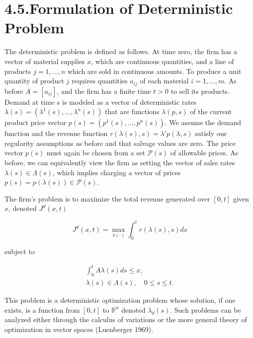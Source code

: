 \section{4.5.Formulation of Deterministic Problem}\label{formulation-ofdeterministic-problem}

The deterministic problem is defined as follows. At time zero, the firm has a vector of material supplies \(x\), which are continuous quantities, and a line of products \(j = 1, \dots, n\) which are sold in continuous amounts. To produce a unit quantity of product \(j\) requires quantities \(a_{ij}\) of each material \(i = 1, \ldots, m\). As before \(A = [a_{ij}]\), and the firm has a finite time \(t > 0\) to sell its products. Demand at time \(s\) is modeled as a vector of deterministic rates \(\lambda(s) = (\lambda^1(s), \ldots, \lambda^n(s))\) that are functions \(\lambda(p, s)\) of the current product price vector \(p(s) = (p^1(s), \ldots, p^n(s))\). We assume the demand function and the revenue function \(r(\lambda(s), s) = \lambda' p(\lambda, s)\) satisfy our regularity assumptions as before and that salvage values are zero. The price vector \(p(s)\) must again be chosen from a set \(\mathcal{P}(s)\) of allowable prices. As before, we can equivalently view the firm as setting the vector of sales rates \(\lambda(s) \in \Lambda(s)\), which implies charging a vector of prices \(p(s) = p(\lambda(s)) \in \mathcal{P}(s)\).

The firm's problem is to maximize the total revenue generated over \([0, t]\) given \(x\), denoted \(J^d(x, t)\)

\[
J^d(x, t) = \operatorname*{max}_{\lambda(\cdot)} \int_{0}^{t} r(\lambda(s), s)  ds
\]

subject to

\[
\begin{array}{l}
\displaystyle \int_{0}^{t} A \lambda(s)  ds \leqslant x, \\
\lambda(s) \in \Lambda(s), \quad 0 \leqslant s \leqslant t.
\end{array}
\]

This problem is a deterministic optimization problem whose solution, if one exists, is a function from \([0, t]\) to \(\mathbb{R}^n\) denoted \(\lambda_d(s)\). Such problems can be analyzed either through the calculus of variations or the more general theory of optimization in vector spaces (Luenberger 1969).

